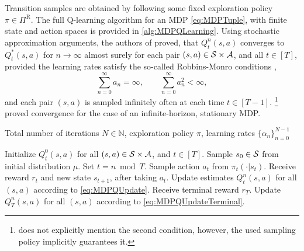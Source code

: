 \documentclass[
    a4paper,
    11pt,
    bibliography=totoc,
    listof=totoc,      
    headinclude=true,
    cleardoublepage=empty,
]{scrbook}
\theoremstyle{plain}
\theoremstyle{definition}
\theoremstyle{remark}
\newcommand{\SetN}{\mathbb N}
\newcommand{\SpaceS}{{\cal S}}
\newcommand{\SpaceA}{{\cal A}}
\begin{document}
Transition samples are obtained by following some fixed exploration policy 
$\pi\in\Pi^\text{R}$. The full Q-learning algorithm for an MDP 
\eqref{eq:MDPTuple}, with finite state and action spaces is provided in
\cref{alg:MDPQLearning}. Using stochastic approximation arguments, the authors
of \cite{vp2024_eemsgwfhq} proved, that $Q^n_t(s,a)$ converges to $Q^*_t(s,a)$ 
for $n\to\infty$ almost surely for each pair $(s,a)\in\SpaceS\times\SpaceA$, 
and all $t\in[T]$, provided the learning rates satisfy the so-called
Robbins-Monro conditions \cite{robbins1951_sam},
\[
    \sum_{n=0}^\infty a_n = \infty, 
    \qquad 
    \sum_{n=0}^\infty a_n^2 < \infty,
\]
and each pair $(s,a)$ is sampled infinitely often at each time $t\in[T-1]$.%
\footnote{
    \cite{vp2024_eemsgwfhq} does not explicitly mention the second condition, 
    however, the used sampling policy implicitly guarantees it. 
}
\cite{watkins1992_q} proved convergence for the case of an infinite-horizon, 
stationary MDP.

\begin{algorithm}
	\caption{Q-learning for finite-horizon, non-stationary, finite MDPs}
	\label{alg:MDPQLearning}
	\begin{algorithmic}[1] 
		\Require Total number of iterations $N\in\SetN$, exploration policy 
        $\pi$, learning rates $\{\alpha_n\}_{n=0}^{N-1}$
                
        \State Initialize $Q^0_t(s,a)$ for all $(s,a)\in\SpaceS\times\SpaceA$, 
         and $t\in[T]$.
		\State Sample $s_0\in\SpaceS$ from initial distribution $\mu$.
            \State Set $t = n \bmod T$.
            \State Sample action $a_t$ from $\pi_t(\cdot|s_t)$.
            \State Receive reward $r_t$ and new state $s_{t+1}$, 
                after taking $a_t$.
            \State Update estimates $Q^{n}_t(s,a)$ for all $(s,a)$ according to
                \eqref{eq:MDPQUpdate}.
                \State Receive terminal reward $r_T$.
                \State Update $Q^{n}_T(s,a)$ for all $(s,a)$ according to
                \eqref{eq:MDPQUpdateTerminal}.
            \EndIf
		\EndFor
	\end{algorithmic}
\end{algorithm}
\end{document}
